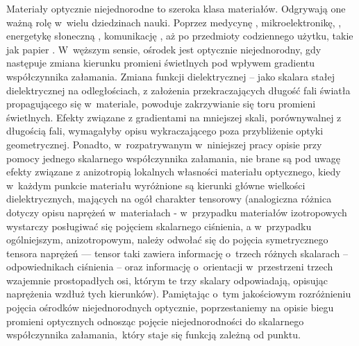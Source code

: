 \indent Materiały optycznie niejednorodne to szeroka klasa materiałów. Odgrywają one ważną rolę w~wielu dziedzinach nauki. Poprzez medycynę \cite{huggins1999physics2000}, mikroelektronikę, \cite{debieu2013structural,bovard1990rugate,kusy1976structure}, energetykę słoneczną \cite{niklasson1985noble,smith1985surface}, komunikację \cite{huggins1999physics2000}, aż po przedmioty codziennego użytku, takie jak papier \cite{missori2004optical,missori2006modifications}. W~węższym sensie, ośrodek jest optycznie niejednorodny, gdy następuje zmiana kierunku promieni świetlnych pod wpływem gradientu współczynnika załamania. Zmiana funkcji die\-lek\-trycz\-nej -- jako skalara stałej dielektrycznej na odległościach, z założenia przekraczających długość fali światła propagującego się w~materiale, powoduje zakrzywianie się toru promieni świetlnych. 
Efekty związane z gradientami na mniejszej skali, porównywalnej z długością fali, wymagałyby opisu wykraczającego poza przybliżenie optyki geometrycznej. Ponadto, w~rozpatrywanym w~niniejszej pracy opisie przy pomocy jednego skalarnego współczynnika załamania, nie brane są pod uwagę efekty związane z anizotropią lokalnych własności materiału optycznego, kiedy w~każdym punkcie materiału wyróżnione są kierunki główne wielkości dielektrycznych, mających na ogół charakter tensorowy (analogiczna różnica dotyczy 
opisu naprężeń w~materiałach - w~przypadku materiałów izotropowych wystarczy posługiwać się pojęciem skalarnego ciśnienia,  a w~przypadku ogólniejszym, anizotropowym, należy odwołać się do pojęcia symetrycznego tensora naprężeń --- tensor taki zawiera informację o~trzech różnych skalarach -- odpowiednikach ciśnienia -- oraz informację o~orientacji w~przestrzeni trzech wzajemnie prostopadłych osi, którym te trzy skalary odpowiadają, opisując naprężenia wzdłuż tych kierunków). Pamiętając o~tym jakościowym rozróżnieniu pojęcia ośrodków niejednorodnych optycznie, poprzestaniemy na opisie biegu promieni optycznych odnosząc pojęcie niejednorodności do skalarnego współczynnika załamania,~który staje się funkcją zależną od punktu. 

